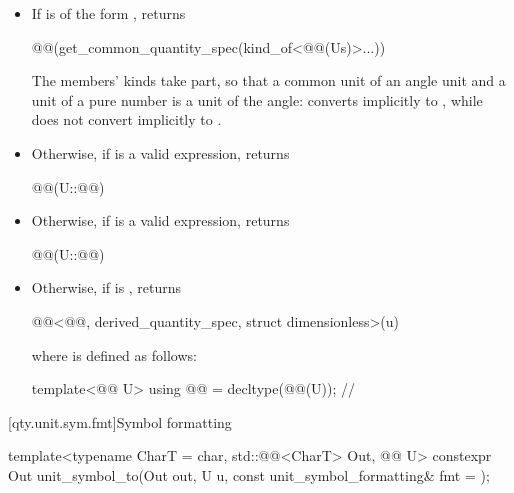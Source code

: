 \begin{itemdescr}
\pnum
\returns
\begin{itemize}
\item
If  is of the form ,
returns
\begin{codeblock}
@@(get_common_quantity_spec(kind_of<@@(Us{})>...))
\end{codeblock}
\begin{note}
The members' kinds take part, so that a common unit of an angle unit and a unit of a pure number
is a unit of the angle:  converts implicitly to
, while  does not convert implicitly to
.
\end{note}
\item
Otherwise, if  is a valid expression,
returns
\begin{codeblock}
@@(U::@@)
\end{codeblock}
\item
Otherwise, if  is a valid expression,
returns
\begin{codeblock}
@@(U::@@)
\end{codeblock}
\item
Otherwise, if
is ,
returns
\begin{codeblock}
@@<@@, derived_quantity_spec, struct dimensionless>(u)
\end{codeblock}
where  is defined as follows:
\begin{codeblock}
template<@@ U>
using @@ = decltype(@@(U{}));  // \expos
\end{codeblock}
\end{itemize}
\end{itemdescr}

[qty.unit.sym.fmt]{Symbol formatting}

\begin{itemdecl}
template<typename CharT = char, std::@@<CharT> Out, @@ U>
constexpr Out unit_symbol_to(Out out, U u, const unit_symbol_formatting& fmt = {});
\end{itemdecl}

